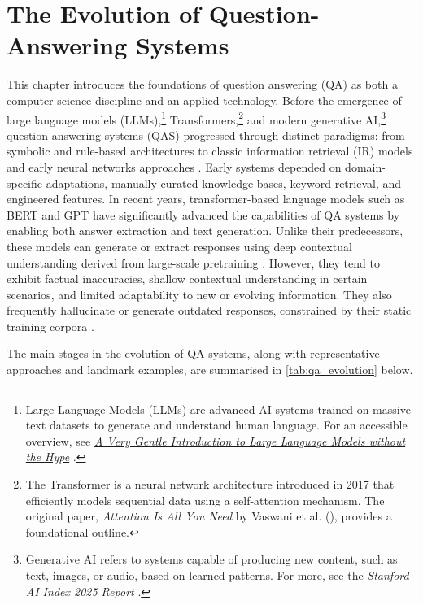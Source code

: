 \chapter{The Evolution of Question-Answering Systems}
\label{chap:QAS}
\sloppy
\begin{spacing}{1.5}

This chapter introduces the foundations of question answering (QA) as both a computer science discipline and an applied technology. Before the emergence of large language models (LLMs),\footnote{Large Language Models (LLMs) are advanced AI systems trained on massive text datasets to generate and understand human language. For an accessible overview, see \href{https://mark-riedl.medium.com/a-very-gentle-introduction-to-large-language-models-without-the-hype-5f67941fa59e}{\textit{A Very Gentle Introduction to Large Language Models without the Hype}} \citep{riedl_very_2023}.} Transformers,\footnote{The Transformer is a neural network architecture introduced in 2017 that efficiently models sequential data using a self-attention mechanism. The original paper, \textit{Attention Is All You Need} by Vaswani et al. (\citeyear{vaswani_attention_2017}), provides a foundational outline.} and modern generative AI,\footnote{Generative AI refers to systems capable of producing new content, such as text, images, or audio, based on learned patterns. For more, see the \textit{Stanford AI Index 2025 Report} \citep{maslej_artificial_2025}.} question-answering systems (QAS) progressed through distinct paradigms: from symbolic and rule-based architectures to classic information retrieval (IR) models and early neural networks approaches \citep{jurafsky_chapter_2024,antoniou_survey_2022}. Early systems depended on domain-specific adaptations, manually curated knowledge bases, keyword retrieval, and engineered features. In recent years, transformer-based language models such as BERT and GPT have significantly advanced the capabilities of QA systems by enabling both answer extraction and text generation. Unlike their predecessors, these models can generate or extract responses using deep contextual understanding derived from large-scale pretraining \citep{kaplan_scaling_2020}. However, they tend to exhibit factual inaccuracies, shallow contextual understanding in certain scenarios, and limited adaptability to new or evolving information. They also frequently hallucinate or generate outdated responses, constrained by their static training corpora \citep{harsh_comprehending_2024}.

The main stages in the evolution of QA systems, along with representative approaches and landmark examples, are summarised in \autoref{tab:qa_evolution} below.


\end{spacing}
